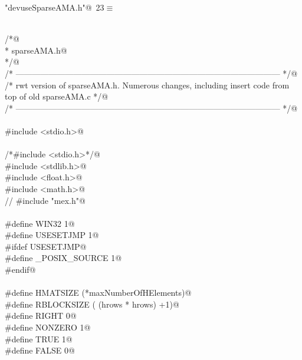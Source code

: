 \documentclass[12pt]{article}
\begin{document}
\begin{flushleft} \small
\begin{minipage}{\linewidth}\label{scrap11}\raggedright\small
{} \verb@"devuseSparseAMA.h"@\nobreak\ {\footnotesize {23}}$\equiv$
\vspace{-1ex}
\begin{list}{}{} \item
\mbox{}\verb@@\\
\mbox{}\verb@/*@\\
\mbox{}\verb@ * sparseAMA.h@\\
\mbox{}\verb@ */@\\
\mbox{}\verb@/* ------------------------------------------------------------------------------------------------ */@\\
\mbox{}\verb@/* rwt version of sparseAMA.h.  Numerous changes, including insert code from top of old sparseAMA.c */@\\
\mbox{}\verb@/* ------------------------------------------------------------------------------------------------ */@\\
\mbox{}\verb@@\\
\mbox{}\verb@#include <stdio.h>@\\
\mbox{}\verb@@\\
\mbox{}\verb@/*#include <stdio.h>*/@\\
\mbox{}\verb@#include <stdlib.h>@\\
\mbox{}\verb@#include <float.h>@\\
\mbox{}\verb@#include <math.h>@\\
\mbox{}\verb@// #include "mex.h"@\\
\mbox{}\verb@@\\
\mbox{}\verb@#define WIN32 1@\\
\mbox{}\verb@#define USESETJMP 1@\\
\mbox{}\verb@#ifdef USESETJMP@\\
\mbox{}\verb@#define _POSIX_SOURCE 1@\\
\mbox{}\verb@#endif@\\
\mbox{}\verb@@\\
\mbox{}\verb@#define HMATSIZE (*maxNumberOfHElements)@\\
\mbox{}\verb@#define RBLOCKSIZE ( (hrows * hrows) +1)@\\
\mbox{}\verb@#define RIGHT 0@\\
\mbox{}\verb@#define NONZERO 1@\\
\mbox{}\verb@#define TRUE 1@\\
\mbox{}\verb@#define FALSE 0@\\

\end{list}
\end{minipage}
\end{flushleft}
\end{document}
